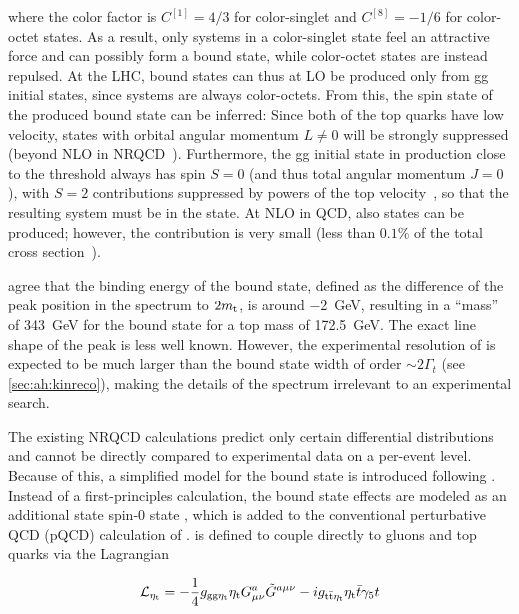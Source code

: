 \noindent where the color factor is $C^{[1]} = 4/3$ for color-singlet and $C^{[8]} = -1/6$ for color-octet states. As a result, only \ttbar systems in a color-singlet state feel an attractive force and can possibly form a bound state, while color-octet states are instead repulsed. At the LHC, \ttbar bound states can thus at LO be produced only from gg initial states, since \qqbar systems are always color-octets. From this, the spin state of the produced bound state can be inferred: Since both of the top quarks have low velocity, states with orbital angular momentum $L \neq 0$ will be strongly suppressed (beyond NLO in NRQCD~\cite{Kiyo:2008bv}). Furthermore, the gg initial state in \ttbar production close to the \ttbar threshold always has spin $S = 0$ (and thus total angular momentum $J = 0$), with $S = 2$ contributions suppressed by powers of the top velocity~\cite{Cheng:2024btk}, so that the resulting \ttbar system must be in the  state. At NLO in QCD, also  states can be produced; however, the contribution is very small (less than $0.1\%$ of the total cross section~\cite{Kiyo:2008bv}).

 agree that the binding energy of the \ttbar bound state, defined as the difference of the peak position in the \mWWbb spectrum to $2 m_{\mathrm{t}}$, is around \SI{-2}{\GeV}, resulting in a ``mass'' of \SI{343}{\GeV} for the \ttbar bound state for a top mass of \SI{172.5}{\GeV}. The exact line shape of the peak is less well known. However, the experimental resolution of \mWWbb is expected to be much larger than the bound state width of order $\sim 2 \Gamma_t$ (see \cref{sec:ah:kinreco}), making the details of the spectrum irrelevant to an experimental search.

The existing NRQCD calculations predict only certain differential distributions and cannot be directly compared to experimental data on a per-event level. Because of this, a simplified model for the \ttbar bound state is introduced following . Instead of a first-principles calculation, the bound state effects are modeled as an additional state spin-0 state \etat, which is added to the conventional perturbative QCD (pQCD) calculation of \ttbar. \etat is defined to couple directly to gluons and top quarks via the Lagrangian

\begin{equation}
\label{eq:theory:etatlagrangian}
  \mathcal{L}_{\mathrm{\eta_t}} = - \frac{1}{4} g_{\mathrm{gg} \mathrm{\eta_t}} \mathrm{\eta_t} G^{a}_{\mu \nu} \tilde{G}^{a \mu \nu} - i g_{\mathrm{t \bar{t}} \mathrm{\eta_t}} \mathrm{\eta_t} \bar{t} \gamma_5 t
\end{equation}


